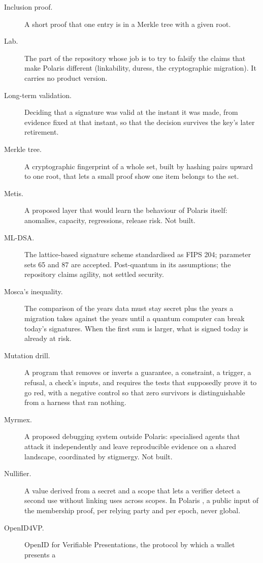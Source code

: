\begin{description}
  \item[Inclusion proof.] A short proof that one entry is in a Merkle tree with a given root.
  \item[Lab.] The part of the repository whose job is to try to falsify the claims that make Polaris
    different (linkability, duress, the cryptographic migration). It carries no product version.
  \item[Long-term validation.] Deciding that a signature was valid at the instant it was made, from
    evidence fixed at that instant, so that the decision survives the key's later retirement.
  \item[Merkle tree.] A cryptographic fingerprint of a whole set, built by hashing pairs upward to one
    root, that lets a small proof show one item belongs to the set.
  \item[Metis.] A proposed layer that would learn the behaviour of Polaris itself: anomalies, capacity,
    regressions, release risk. Not built.
  \item[ML-DSA.] The lattice-based signature scheme standardised as FIPS 204; parameter sets 65 and
    87 are accepted. Post-quantum in its assumptions; the repository claims agility, not settled
    security.
  \item[Mosca's inequality.] The comparison of the years data must stay secret plus the years a migration
    takes against the years until a quantum computer can break today's signatures. When the first
    sum is larger, what is signed today is already at risk.
  \item[Mutation drill.] A program that removes or inverts a guarantee, a constraint, a trigger, a
    refusal, a check's inputs, and requires the tests that supposedly prove it to go red, with a
    negative control so that zero survivors is distinguishable from a harness that ran nothing.
  \item[Myrmex.] A proposed debugging system outside Polaris: specialised agents that attack it independently
    and leave reproducible evidence on a shared landscape, coordinated by stigmergy. Not built.
  \item[Nullifier.] A value derived from a secret and a scope that lets a verifier detect a second
    use without linking uses across scopes. In Polaris ,
    a public input of the membership proof, per relying party and per epoch, never global.
  \item[OpenID4VP.] OpenID for Verifiable Presentations, the protocol by which a wallet presents a

\end{description}

